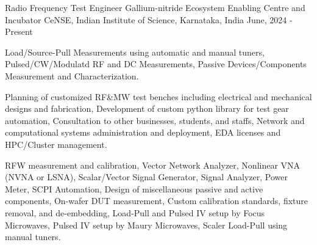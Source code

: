 

\begin{cventries}

  \cventry
    {Radio Frequency Test Engineer} %
    {Gallium-nitride Ecosystem Enabling Centre and Incubator} %
    {CeNSE, Indian Institute of Science, Karnataka, India} %
    {June, 2024 - Present} %
    {
      \begin{cvitems} %
        \item { Load/Source-Pull Measurements using automatic and manual tuners, Pulsed/CW/Modulatd RF and DC Measurements, Passive Devices/Components Measurement and Characterization.}
        \item { Planning of customized RF\&MW test benches including electrical and mechanical designs and fabrication, Development of custom python library for test gear automation, Consultation to other businesses, students, and staffs, Network and computational systems administration and deployment, EDA licenses and HPC/Cluster management.}
        \item { RF{\textmu}W measurement and calibration, Vector Network Analyzer, Nonlinear VNA (NVNA or LSNA), Scalar/Vector Signal Generator, Signal Analyzer, Power Meter, SCPI Automation, Design of miscellaneous passive and active components, On-wafer DUT measurement, Custom calibration standards, fixture removal, and de-embedding, Load-Pull and Pulsed IV setup by Focus Microwaves, Pulsed IV setup by Maury Microwaves, Scaler Load-Pull using manual tuners.}
      \end{cvitems}
    }

\end{cventries}